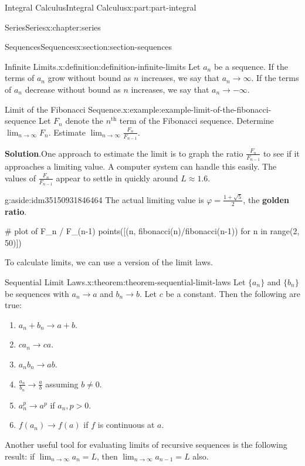 \documentclass[twoside,10pt,]{book}
\newcommand{\blocktitlefont}{\relax}
\newcommand{\terminology}[1]{\textbf{#1}}
\numberwithin{equation}{part}
\newcommand{\gt}{>}
\begin{document}
\begin{partptx}{Integral Calculus}{}{Integral Calculus}{}{}{x:part:part-integral}
\begin{chapterptx}{Series}{}{Series}{}{}{x:chapter:series}
\begin{sectionptx}{Sequences}{}{Sequences}{}{}{x:section:section-sequences}
\begin{definition}{Infinite Limits.}{x:definition:definition-infinite-limits}
Let \(a_{n}\) be a sequence. If the terms of \(a_{n}\) grow without bound as \(n\) increases, we say that \(a_{n}\to\infty\). If the terms of \(a_{n}\) decrease without bound as \(n\) increases, we say that \(a_{n}\to-\infty\).%
\end{definition}
\begin{example}{Limit of the Fibonacci Sequence.}{x:example:example-limit-of-the-fibonacci-sequence}%
Let \(F_{n}\) denote the \(n^{\text{th}}\) term of the Fibonacci sequence. Determine \(\lim_{n\to\infty}F_{n}\). Estimate \(\lim_{n\to\infty}\frac{F_{n}}{F_{n-1}}\).%
\par\smallskip%
\noindent\textbf{\blocktitlefont Solution}.\hypertarget{g:solution:idm35150931848128}{}\quad{}One approach to estimate the limit is to graph the ratio \(\frac{F_n}{F_{n-1}}\) to see if it approaches a limiting value. A computer system can handle this easily. The values of \(\frac{F_n}{F_{n-1}}\) appear to settle in quickly around \(L\approx1.6\). \begin{aside}{}{g:aside:idm35150931846464}%
The actual limiting value is \(\varphi = \frac{1+\sqrt{5}}{2}\), the \terminology{golden ratio}.%
\end{aside}
%
\end{example}
\begin{sageinput}
# plot of F_n / F_(n-1)
points([(n, fibonacci(n)/fibonacci(n-1)) for n in range(2, 50)])
\end{sageinput}
To calculate limits, we can use a version of the limit laws.%
\begin{theorem}{Sequential Limit Laws.}{}{x:theorem:theorem-sequential-limit-laws}%
Let \(\{a_{n}\}\) and \(\{b_{n}\}\) be sequences with \(a_{n}\to a\) and \(b_{n}\to b\). Let \(c\) be a constant. Then the following are true:%
%
\begin{enumerate}
\item{}\(\displaystyle a_{n} + b_{n} \to a + b.\)%
\item{}\(\displaystyle ca_{n}\to ca.\)%
\item{}\(\displaystyle a_{n}b_{n}\to ab.\)%
\item{}\(\frac{a_{n}}{b_{n}}\to\frac{a}{b}\) assuming \(b\neq 0\).%
\item{}\(a_{n}^{p}\to a^{p}\) if \(a_{n},p \gt 0\).%
\item{}\(f(a_{n})\to f(a)\) if \(f\) is continuous at \(a\).%
\end{enumerate}
\end{theorem}
Another useful tool for evaluating limits of recursive sequences is the following result: if \(\lim_{n\to\infty}a_{n} = L\), then \(\lim_{n\to\infty}a_{n-1} = L\) also.%

\end{sectionptx}
\end{chapterptx}
\end{partptx}
\end{document}
